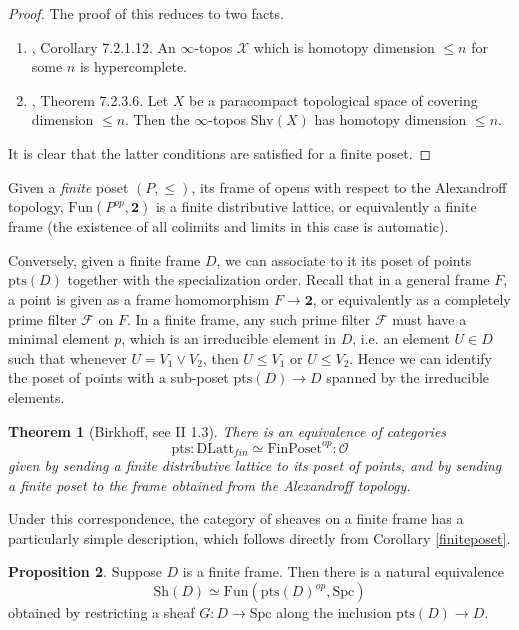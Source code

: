 \documentclass[10pt]{amsart}
\newtheorem{theorem}{Theorem}[section]
\theoremstyle{definition}
\newtheorem{proposition}[theorem]{Proposition}
\begin{document}
\begin{proof}
The proof of this reduces to two facts.
\begin{enumerate}
\item \cite{luriehtt}, Corollary 7.2.1.12. An $\infty$-topos $\mathcal{X}$ which is homotopy dimension $\leq n$ for some $n$ is hypercomplete.
\item \cite{luriehtt}, Theorem 7.2.3.6. Let $X$ be a paracompact topological space of covering dimension $\leq n$. Then the $\infty$-topos $\mathrm{Shv}(X)$ has homotopy dimension $\leq n$.
\end{enumerate}
It is clear that the latter conditions are satisfied for a finite poset.
\end{proof}

Given a \emph{finite} poset $(P,\leq)$, its frame of opens with respect to the Alexandroff topology, $\mathrm{Fun}(P^{op},\mathbf{2})$ is a finite distributive lattice, or equivalently a finite frame (the existence of all colimits and limits in this case is automatic).

Conversely, given a finite frame $D$, we can associate to it its poset of points $\mathrm{pts}(D)$ together with the specialization order. Recall that in a general frame $F$, a point is given as a frame homomorphism $F \rightarrow \mathbf{2}$, or equivalently as a completely prime filter $\mathcal{F}$ on $F$. In a finite frame, any such prime filter $\mathcal{F}$ must have a minimal element $p$, which is an irreducible element in $D$, i.e. an element $U \in D$ such that whenever $U = V_1 \vee V_2$, then $U \leq V_1$ or $U \leq V_2$. Hence we can identify the poset of points with a sub-poset $\mathrm{pts}(D) \rightarrow D$ spanned by the irreducible elements. 

\begin{theorem}[Birkhoff, see \cite{grätzer2011lattice} II 1.3]
There is an equivalence of categories
$$\mathrm{pts} : \mathrm{DLatt}_{fin} \simeq \mathrm{FinPoset}^{op} : \mathcal{O}$$
given by sending a finite distributive lattice to its poset of points, and by sending a finite poset to the frame obtained from the Alexandroff topology. 
\end{theorem}

Under this correspondence, the category of sheaves on a finite frame has a particularly simple description, which follows directly from Corollary \ref{finiteposet}.

\begin{proposition} \label{sheavesonfiniteframe}
Suppose $D$ is a finite frame. Then there is a natural equivalence
$$\mathrm{Sh}(D) \simeq \mathrm{Fun}( \mathrm{pts}(D)^{op}, \mathrm{Spc} )$$
obtained by restricting a sheaf $G : D \rightarrow \mathrm{Spc}$ along the inclusion $\mathrm{pts}(D) \rightarrow D$.
\end{proposition}
\end{document}
